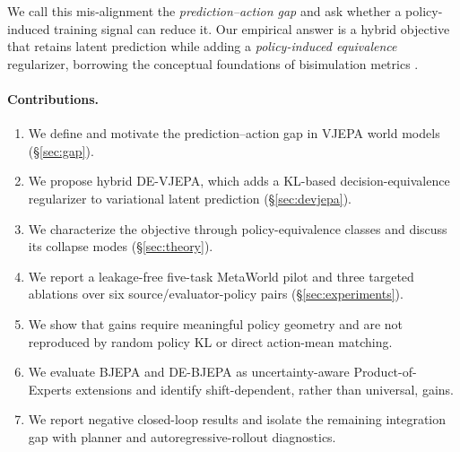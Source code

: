 \documentclass[10pt,twocolumn]{article}
\theoremstyle{tightstyle}
\begin{document}
We call this mis-alignment the \emph{prediction--action gap} and ask whether a
policy-induced training signal can reduce it.
Our empirical answer is a hybrid objective that retains latent prediction while
adding a \emph{policy-induced equivalence} regularizer, borrowing the conceptual
foundations of bisimulation metrics \citep{ferns2004metrics}.

\paragraph{Contributions.}
\begin{enumerate}[leftmargin=*,topsep=0pt,itemsep=0pt]
  \item We define and motivate the prediction--action gap in VJEPA world models (\S\ref{sec:gap}).
  \item We propose hybrid DE-VJEPA, which adds a KL-based decision-equivalence
        regularizer to variational latent prediction (\S\ref{sec:devjepa}).
  \item We characterize the objective through policy-equivalence classes and
        discuss its collapse modes (\S\ref{sec:theory}).
  \item We report a leakage-free five-task MetaWorld pilot and three targeted
        ablations over six source/evaluator-policy pairs (\S\ref{sec:experiments}).
  \item We show that gains require meaningful policy geometry and are not
        reproduced by random policy KL or direct action-mean matching.
  \item We evaluate BJEPA and DE-BJEPA as uncertainty-aware Product-of-Experts
        extensions and identify shift-dependent, rather than universal, gains.
  \item We report negative closed-loop results and isolate the remaining
        integration gap with planner and autoregressive-rollout diagnostics.
\end{enumerate}
\end{document}
